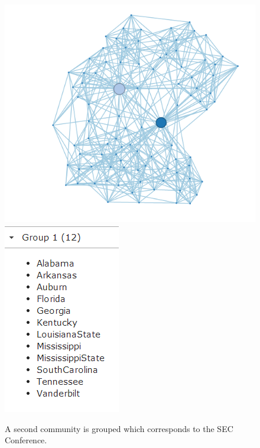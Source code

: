 \documentclass{article}\usepackage[]{graphicx}\usepackage[]{color}
\begin{document}
\begin{figure}[H]
\centering
\includegraphics[width=\textwidth]{images/football_6.png}
\includegraphics[width=\textwidth]{images/football_7.png}
\caption{\label{fig:football_6} A second community is grouped which corresponds to the SEC Conference.}
\end{figure}
\end{document}
